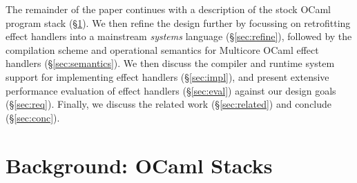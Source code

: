 \documentclass[sigplan,10pt,review,anonymous]{acmart}\settopmatter{printfolios=true,printccs=false,printacmref=false}
\begin{document}
The remainder of the paper continues with a description of the stock OCaml
program stack (\S\ref{sec:stack}). We then refine the design further by
focussing on retrofitting effect handlers into a mainstream \emph{systems}
language (\S\ref{sec:refine}), followed by the compilation scheme and
operational semantics for Multicore OCaml effect handlers
(\S\ref{sec:semantics}).  We then discuss the compiler and runtime system
support for implementing effect handlers (\S\ref{sec:impl}), and present
extensive performance evaluation of effect handlers (\S\ref{sec:eval}) against
our design goals (\S\ref{sec:req}). Finally, we discuss the related work
(\S\ref{sec:related}) and conclude (\S\ref{sec:conc}).

\section{Background: OCaml Stacks}
\label{sec:stack}
\end{document}
